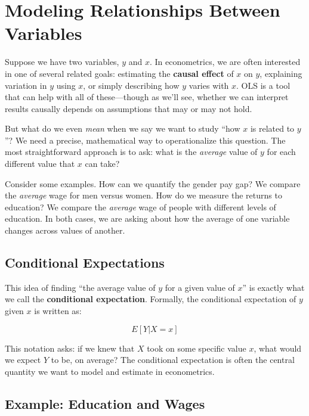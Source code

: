 \documentclass[
  letterpaper,
  DIV=11,
  numbers=noendperiod]{scrreprt}
\begin{document}
\section{Modeling Relationships Between
Variables}\label{modeling-relationships-between-variables}

Suppose we have two variables, \(y\) and \(x\). In econometrics, we are
often interested in one of several related goals: estimating the
\textbf{causal effect} of \(x\) on \(y\), explaining variation in \(y\)
using \(x\), or simply describing how \(y\) varies with \(x\). OLS is a
tool that can help with all of these---though as we'll see, whether we
can interpret results causally depends on assumptions that may or may
not hold.

But what do we even \emph{mean} when we say we want to study ``how \(x\)
is related to \(y\)''? We need a precise, mathematical way to
operationalize this question. The most straightforward approach is to
ask: what is the \emph{average} value of \(y\) for each different value
that \(x\) can take?

Consider some examples. How can we quantify the gender pay gap? We
compare the \emph{average} wage for men versus women. How do we measure
the returns to education? We compare the \emph{average} wage of people
with different levels of education. In both cases, we are asking about
how the average of one variable changes across values of another.

\subsection{Conditional Expectations}\label{conditional-expectations}

This idea of finding ``the average value of \(y\) for a given value of
\(x\)'' is exactly what we call the \textbf{conditional expectation}.
Formally, the conditional expectation of \(y\) given \(x\) is written
as:

\[
E[Y | X = x]
\]

This notation asks: if we knew that \(X\) took on some specific value
\(x\), what would we expect \(Y\) to be, on average? The conditional
expectation is often the central quantity we want to model and estimate
in econometrics.

\subsection{Example: Education and
Wages}\label{example-education-and-wages}
\end{document}
